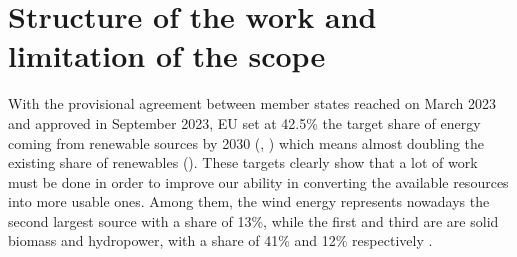 \newpage
\section{Structure of the work and limitation of the scope}\label{sec:b_introduction}
With the provisional agreement between member states reached on March 2023 and approved in September 2023, EU set at 42.5\% the target share of energy coming from renewable sources by 2030 (\cite{rauters}, \cite{EU_targets}) which means almost doubling the existing share of renewables (\cite{EU_targets}). These targets clearly show that a lot of work must be done in order to improve our ability in converting the available resources into more usable ones. Among them, the wind energy represents nowadays the second largest source with a share of 13\%, while the first and third are are solid biomass and hydropower, with a share of 41\% and 12\% respectively \cite{ren_share}. 

